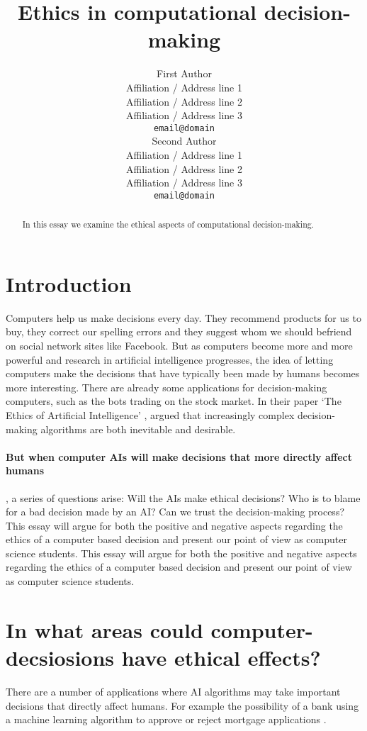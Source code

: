 \documentclass[11pt]{article}
\title{Ethics in computational decision-making}
\author{First Author \\
  Affiliation / Address line 1 \\
  Affiliation / Address line 2 \\
  Affiliation / Address line 3 \\
  {\tt email@domain} \\\And
  Second Author \\
  Affiliation / Address line 1 \\
  Affiliation / Address line 2 \\
  Affiliation / Address line 3 \\
  {\tt email@domain} \\}
\date{}
\begin{document}
\maketitle
\begin{abstract}
  In this essay we examine the ethical aspects of computational decision-making.
\end{abstract}

\section{Introduction}
Computers help us make decisions every day. They recommend products for us to
buy, they correct our spelling errors and they suggest whom we should befriend
on social network sites like Facebook. But as computers become more and more
powerful and research in artificial intelligence progresses, the idea of letting
computers make the decisions that have typically been made by humans becomes
more interesting. There are already some applications for decision-making
computers, such as the bots trading on the stock market. In their paper ‘The Ethics of Artificial Intelligence’ \citeyear{bostrom2013ethics}, \citeauthor{bostrom2013ethics} argued that increasingly complex decision-making algorithms are both inevitable and desirable. 

\paragraph{But when computer AIs will make decisions that more directly affect humans}, a series of questions
arise: Will the AIs make ethical decisions? Who is to blame for a bad decision
made by an AI? Can we trust the decision-making process? This essay will argue 
for both the positive and negative aspects regarding the ethics of a computer 
based decision and present our point of view as computer science students. 
This essay will argue for both the positive and negative aspects regarding the ethics of a computer based decision and present our point of view as computer science students. 

\section{In what areas could computer-decsiosions have ethical effects?}
There are a number of applications where AI algorithms may take important decisions that directly
affect humans. For example the possibility of
a bank using a machine learning algorithm to approve or reject mortgage
applications \cite{bostrom2013ethics}. 
\end{document}
